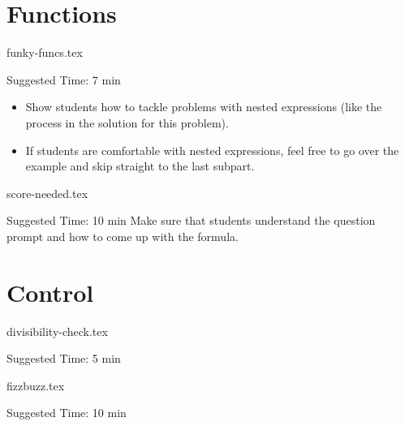 \documentclass{exam}
\begin{document}
\section{Functions}
\begin{questions}
    {funky-funcs.tex}
    \begin{questionmeta}
        Suggested Time: 7 min
        \begin{itemize}
            \item Show students how to tackle problems with nested expressions (like the process in the solution for this problem).
            \item If students are comfortable with nested expressions, feel free to go over the example and skip straight to the last subpart. 
        \end{itemize}
    \end{questionmeta}

    {score-needed.tex}
    \begin{questionmeta}
    Suggested Time: 10 min
    Make sure that students understand the question prompt and how to come up with the formula.
    \end{questionmeta}  
\end{questions}

\section{Control}
\begin{questions}
    {divisibility-check.tex}
    \begin{questionmeta}
        Suggested Time: 5 min
    \end{questionmeta}

    {fizzbuzz.tex}
    \begin{questionmeta}
        Suggested Time: 10 min
    \end{questionmeta}
\end{questions}
\end{document}
